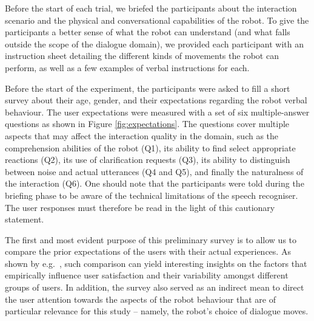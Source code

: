 Before the start of each trial, we briefed the participants about the interaction scenario and the physical and conversational capabilities of the robot. To give the participants a better sense of what the robot can understand (and what falls outside the scope of the dialogue domain), we provided each participant with an instruction sheet detailing the different kinds of movements the robot can perform, as well as a few examples of verbal instructions for each.

Before the start of the experiment, the participants were asked to fill a short survey about their age, gender, and their expectations regarding the robot verbal behaviour. The user expectations were measured with a set of six multiple-answer questions as shown in Figure \ref{fig:expectations}. The questions cover multiple aspects that may affect the interaction quality in the domain, such as the comprehension abilities of the robot (Q1), its ability to find select appropriate reactions (Q2), its use of clarification requests (Q3), its ability to distinguish between noise and actual utterances (Q4 and Q5), and finally the naturalness of the interaction (Q6). One should note that the participants were told during the briefing phase to be aware of the technical limitations of the speech recogniser. The user responses must therefore be read in the light of this cautionary statement. 


The first and most evident purpose of this preliminary survey is to allow us to compare the prior expectations of the users with their actual experiences.  As shown by e.g.\ \cite{JokinenH06}, such comparison can yield interesting insights on the factors that empirically influence user satisfaction and their variability amongst different groups of users.  In addition, the survey also served as an indirect mean to direct the user attention towards the aspects of the robot behaviour that are of particular relevance for this study -- namely, the robot's choice of dialogue moves. 


